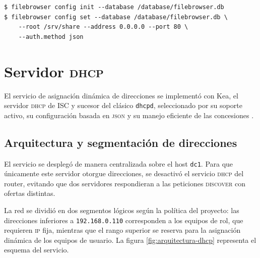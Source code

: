 \begin{lstlisting}[style=terminal]
$ filebrowser config init --database /database/filebrowser.db
$ filebrowser config set --database /database/filebrowser.db \
    --root /srv/share --address 0.0.0.0 --port 80 \
    --auth.method json
\end{lstlisting}


\section{Servidor \textsc{dhcp}}

El servicio de asignaci\'on din\'amica de direcciones se implement\'o con
Kea, el servidor \textsc{dhcp} de ISC y sucesor del cl\'asico
\texttt{dhcpd}, seleccionado por su soporte activo, su configuraci\'on
basada en \textsc{json} y su manejo eficiente de las concesiones
\cite{rfc2131, keaDocs}.

\subsection{Arquitectura y segmentaci\'on de direcciones}

El servicio se despleg\'o de manera centralizada sobre el host \texttt{dc1}.
Para que \'unicamente este servidor otorgue direcciones, se desactiv\'o el
servicio \textsc{dhcp} del router, evitando que dos servidores respondieran a
las peticiones \textsc{discover} con ofertas distintas.

La red se dividi\'o en dos segmentos l\'ogicos seg\'un la pol\'itica del
proyecto: las direcciones inferiores a \texttt{192.168.0.110} corresponden a
los equipos de rol, que requieren \textsc{ip} fija, mientras que el rango
superior se reserva para la asignaci\'on din\'amica de los equipos de
usuario. La figura \ref{fig:arquitectura-dhcp} representa el esquema del
servicio.

